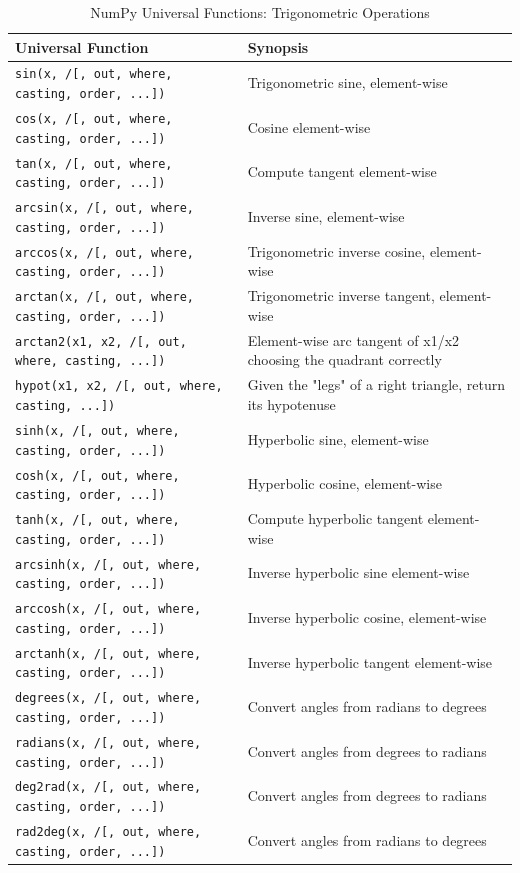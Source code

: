 \documentclass[a4paper,11pt]{book}
\begin{document}
\begin{appendices}
\begin{table}
\caption{NumPy Universal Functions: Trigonometric Operations}
\centering
\begin{tabular}{lp{13cm}}
\toprule \toprule 
Universal Function & Synopsis }\\
\midrule
\texttt{sin(x, /[, out, where, casting, order, ...])} & Trigonometric sine, element-wise}\\
\texttt{cos(x, /[, out, where, casting, order, ...])} & Cosine element-wise}\\
\texttt{tan(x, /[, out, where, casting, order, ...])} & Compute tangent element-wise}\\
\texttt{arcsin(x, /[, out, where, casting, order, ...])} & Inverse sine, element-wise}\\
\texttt{arccos(x, /[, out, where, casting, order, ...])} & Trigonometric inverse cosine, element-wise}\\
\texttt{arctan(x, /[, out, where, casting, order, ...])} & Trigonometric inverse tangent, element-wise}\\
\texttt{arctan2(x1, x2, /[, out, where, casting, ...])} & Element-wise arc tangent of x1/x2 choosing the quadrant correctly}\\
\texttt{hypot(x1, x2, /[, out, where, casting, ...])} & Given the "legs" of a right triangle, return its hypotenuse}\\
\texttt{sinh(x, /[, out, where, casting, order, ...])} & Hyperbolic sine, element-wise}\\
\texttt{cosh(x, /[, out, where, casting, order, ...])} & Hyperbolic cosine, element-wise\\
\texttt{tanh(x, /[, out, where, casting, order, ...])} & Compute hyperbolic tangent element-wise\\
\texttt{arcsinh(x, /[, out, where, casting, order, ...])} & Inverse hyperbolic sine element-wise\\
\texttt{arccosh(x, /[, out, where, casting, order, ...])} & Inverse hyperbolic cosine, element-wise\\
\texttt{arctanh(x, /[, out, where, casting, order, ...])} & Inverse hyperbolic tangent element-wise\\
\texttt{degrees(x, /[, out, where, casting, order, ...])} & Convert angles from radians to degrees\\
\texttt{radians(x, /[, out, where, casting, order, ...])} & Convert angles from degrees to radians\\
\texttt{deg2rad(x, /[, out, where, casting, order, ...])} & Convert angles from degrees to radians\\
\texttt{rad2deg(x, /[, out, where, casting, order, ...])} & Convert angles from radians to degrees\\
\bottomrule
\end{tabular}
\end{table}
\clearpage


\end{appendices}
\end{document}
